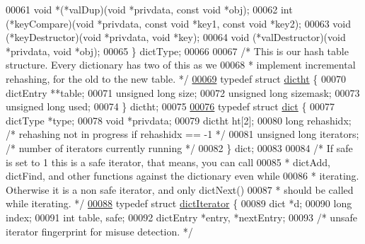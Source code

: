 \begin{DoxyCode}
00061     \textcolor{keywordtype}{void} *(*valDup)(\textcolor{keywordtype}{void} *privdata, \textcolor{keyword}{const} \textcolor{keywordtype}{void} *obj);
00062     \textcolor{keywordtype}{int} (*keyCompare)(\textcolor{keywordtype}{void} *privdata, \textcolor{keyword}{const} \textcolor{keywordtype}{void} *key1, \textcolor{keyword}{const} \textcolor{keywordtype}{void} *key2);
00063     \textcolor{keywordtype}{void} (*keyDestructor)(\textcolor{keywordtype}{void} *privdata, \textcolor{keywordtype}{void} *key);
00064     \textcolor{keywordtype}{void} (*valDestructor)(\textcolor{keywordtype}{void} *privdata, \textcolor{keywordtype}{void} *obj);
00065 \} dictType;
00066 
00067 \textcolor{comment}{/* This is our hash table structure. Every dictionary has two of this as we}
00068 \textcolor{comment}{ * implement incremental rehashing, for the old to the new table. */}
\hyperlink{structdictht}{00069} \textcolor{keyword}{typedef} \textcolor{keyword}{struct} \hyperlink{structdictht}{dictht} \{
00070     dictEntry **table;
00071     \textcolor{keywordtype}{unsigned} \textcolor{keywordtype}{long} size;
00072     \textcolor{keywordtype}{unsigned} \textcolor{keywordtype}{long} sizemask;
00073     \textcolor{keywordtype}{unsigned} \textcolor{keywordtype}{long} used;
00074 \} dictht;
00075 
\hyperlink{structdict}{00076} \textcolor{keyword}{typedef} \textcolor{keyword}{struct} \hyperlink{structdict}{dict} \{
00077     dictType *type;
00078     \textcolor{keywordtype}{void} *privdata;
00079     dictht ht[2];
00080     \textcolor{keywordtype}{long} rehashidx; \textcolor{comment}{/* rehashing not in progress if rehashidx == -1 */}
00081     \textcolor{keywordtype}{unsigned} \textcolor{keywordtype}{long} iterators; \textcolor{comment}{/* number of iterators currently running */}
00082 \} dict;
00083 
00084 \textcolor{comment}{/* If safe is set to 1 this is a safe iterator, that means, you can call}
00085 \textcolor{comment}{ * dictAdd, dictFind, and other functions against the dictionary even while}
00086 \textcolor{comment}{ * iterating. Otherwise it is a non safe iterator, and only dictNext()}
00087 \textcolor{comment}{ * should be called while iterating. */}
\hyperlink{structdictIterator}{00088} \textcolor{keyword}{typedef} \textcolor{keyword}{struct} \hyperlink{structdictIterator}{dictIterator} \{
00089     dict *d;
00090     \textcolor{keywordtype}{long} index;
00091     \textcolor{keywordtype}{int} table, safe;
00092     dictEntry *entry, *nextEntry;
00093     \textcolor{comment}{/* unsafe iterator fingerprint for misuse detection. */}

\end{DoxyCode}

